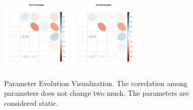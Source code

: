 \begin{figure}[h]
\includegraphics[width=0.3\textwidth,height=0.2\textheight]{Chapters/05MCMCOU/plots/paraEvolution/corMatrix47.pdf}
\includegraphics[width=0.3\textwidth,height=0.2\textheight]{Chapters/05MCMCOU/plots/paraEvolution/corMatrix48.pdf}
\caption{Parameter Evolution Visualization. The correlation among parameters does not change two much. The parameters are considered static. }\label{ParameterEvolutionVisualization}
\end{figure}
